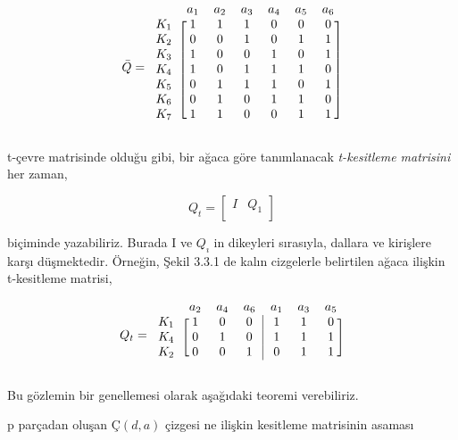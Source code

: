 \documentclass[11pt]{amsbook}
\begin{document}
    $$ \bar {Q} =
    \begin{blockarray}{ccccccc}
        & a_1 & a_2 & a_3 & a_4 & a_5 & a_6 \\
        \begin{block}{c[cccccc]}
            K_1 & 1  & 1  & 1  & 0  & 0  & 0  \\
            K_2 & 0  & 0  & 1  & 0  & 1  & 1  \\
            K_3 & 1  & 0  & 0  & 1  & 0  & 1  \\
            K_4 & 1  & 0  & 1  & 1  & 1  & 0  \\
            K_5 & 0  & 1  & 1  & 1  & 0  & 1  \\
            K_6 & 0  & 1  & 0  & 1  & 1  & 0  \\
            K_7 & 1  & 1  & 0  & 0  & 1  & 1  \\
        \end{block}
    \end{blockarray}
    $$
    
    t-çevre matrisinde olduğu gibi, bir ağaca göre tanımlanacak \emph{t-kesitleme matrisini} her zaman, 
    
    \[
        Q_t = 
        \left[
            \begin{array}{cc} 
                I &Q_1  \\
            \end{array} 
        \right]
    \]
    
    biçiminde yazabiliriz. Burada I ve $Q_{ı}$ in dikeyleri sırasıyla, dallara ve kirişlere karşı düşmektedir. Örneğin, Şekil 3.3.1 de kalın cizgelerle belirtilen ağaca ilişkin t-kesitleme matrisi,

    $$ {Q}_{t} = 
    \begin{blockarray}{ccccccc}
            & a_2 & a_4 & a_6 & a_1 & a_3 & a_5 \\
        \begin{block}{c[ccc|ccc]}
            K_1 &1  &0  &0  &1  &1  &0  \\
            K_4 &0  &1  &0  &1  &1  &1  \\
            K_2 &0  &0  &1  &0  &1  &1  \\
        \end{block}
    \end{blockarray}
    $$

    Bu gözlemin bir genellemesi olarak aşağıdaki teoremi verebiliriz. 
    
    \begin{theorem}
        {p parçadan oluşan $Ç(d,a)$ çizgesi ne ilişkin kesitleme matrisinin asaması}
    \end{theorem}
\end{document}
